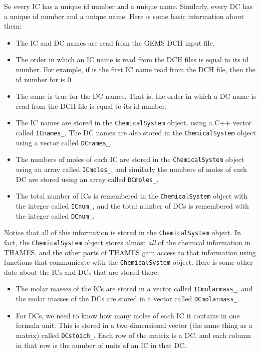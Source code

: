 \documentclass{article}
\begin{document}
So every IC has a unique id number and a unique name.  Similarly, every DC has
a unique id number and a unique name.  Here is some basic information
about them:
\begin{itemize}
\item The IC and DC names are read from the GEMS DCH input file.
\item The order in which an IC name is read from the DCH files is equal to
    its id number.  For example, if  is the first IC name read from the
    DCH file, then the id number for  is 0.
\item The same is true for the DC names.  That is, the order in which a DC name
    is read from the DCH file is equal to its id number.
\item The IC names are stored in the \verb!ChemicalSystem! object,
    using a C++ vector called \verb!ICnames_!.  The DC names are also stored
    in the \verb!ChemicalSystem! object using a vector called \verb!DCnames_!.
\item The numbers of moles of each IC are stored in the \verb!ChemicalSystem!
    object using an array called \verb!ICmoles_!, and similarly the numbers
    of moles of each DC are stored using an array called \verb!DCmoles_!.
\item The total number of ICs is remembered in the \verb!ChemicalSystem! object
    with the integer called \verb!ICnum_!, and the total number of DCs is
    remembered with the integer called \verb!DCnum_!.
\end{itemize}

Notice that all of this information is stored in the \verb!ChemicalSystem! object.
In fact, the \verb!ChemicalSystem! object stores almost \textit{all} of the chemical
information in THAMES, and the other parts of THAMES gain access to that information
using functions that communicate with the \verb!ChemicalSystem! object.  Here is
some other date about the ICs and DCs that are stored there:
\begin{itemize}
    \item The molar masses of the ICs are stored in a vector called
        \verb!ICmolarmass_!, and the molar masses of the DCs are stored
        in a vector called \verb!DCmolarmass_!.
    \item For DCs, we need to know how many moles of each IC it contains in one
        formula unit.  This is stored in a two-dimensional vector (the same thing
        as a matrix) called \verb!DCstoich_!.  Each row of the matrix is a DC,
        and each column in that row is the number of units of an IC in that DC.
\end{itemize}
\end{document}
